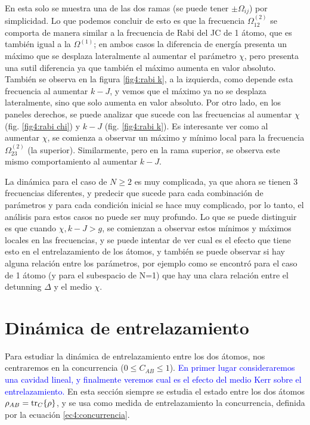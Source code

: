 En esta solo se muestra una de las dos ramas (se puede tener $\pm \Omega_{ij}$) por simplicidad. Lo que podemos concluir de esto es que la frecuencia $\Omega^(2)_{12}$ se comporta de manera similar a la frecuencia de Rabi del JC de 1 átomo, que es también igual a la $\Omega^(1)$; en ambos casos la diferencia de energía presenta un máximo que se desplaza lateralmente al aumentar el parámetro $\chi$, pero presenta una sutil diferencia ya que también el máximo aumenta en valor absoluto. También se observa en la figura \ref{fig4:rabi k}, a la izquierda, como depende esta frecuencia al aumentar $k-J$, y vemos que el máximo ya no se desplaza lateralmente, sino que solo aumenta en valor absoluto. Por otro lado, en los paneles derechos, se puede analizar que sucede con las frecuencias al aumentar $\chi$ (fig. \ref{fig4:rabi chi}) y $k-J$ (fig. \ref{fig4:rabi k}). Es interesante ver como al aumentar $\chi$, se comienza a observar un máximo y mínimo local para la frecuencia $\Omega^{(2)}_{23}$ (la superior). Similarmente, pero en la rama superior, se observa este mismo comportamiento al aumentar $k-J$.

La dinámica para el caso de $N\geq2$ es muy complicada, ya que ahora se tienen 3 frecuencias diferentes, y predecir que sucede para cada combinación de parámetros y para cada condición inicial se hace muy complicado, por lo tanto, el análisis para estos casos no puede ser muy profundo. Lo que se puede distinguir es que cuando $\chi,k-J>g$, se comienzan a observar estos mínimos y máximos locales en las frecuencias, y se puede intentar de ver cual es el efecto que tiene esto en el entrelazamiento de los átomos, y también se puede observar si hay alguna relación entre los parámetros, por ejemplo como se encontró para el caso de 1 átomo (y para el subespacio de N=1) que hay una clara relación entre el detunning $\Delta$ y el medio $\chi$.

\section{Dinámica de entrelazamiento}
Para estudiar la dinámica de entrelazamiento entre los dos átomos, nos centraremos en la concurrencia ($0\leq C_{AB} \leq 1$).
\textcolor{blue}{En primer lugar consideraremos una cavidad lineal, y finalmente veremos cual es el efecto del medio Kerr sobre el entrelazamiento.}
En esta sección siempre se estudia el estado entre los dos átomos $\rho_{AB}=\tr_C\{\rho\}$, y se usa como medida de entrelazamiento la concurrencia, definida por la ecuación \ref{ec4:concurrencia}.

